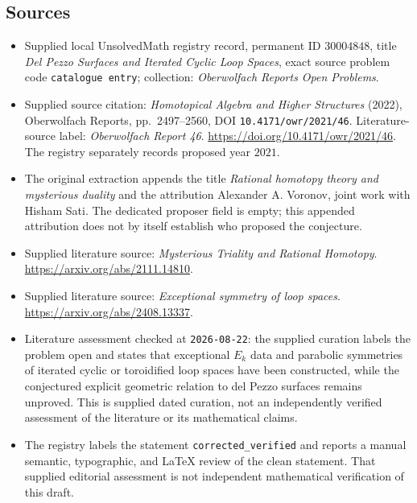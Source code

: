 \documentclass[11pt]{article}
\begin{document}
\subsection{Sources}
\begin{itemize}
\item Supplied local UnsolvedMath registry record, permanent ID \(30004848\), title \emph{Del Pezzo Surfaces and Iterated Cyclic Loop Spaces}, exact source problem code \texttt{catalogue entry}; collection: \emph{Oberwolfach Reports Open Problems}.
\item Supplied source citation: \emph{Homotopical Algebra and Higher Structures} (2022), Oberwolfach Reports, pp.~2497--2560, DOI \texttt{10.4171/owr/2021/46}. Literature-source label: \emph{Oberwolfach Report 46}. \url{https://doi.org/10.4171/owr/2021/46}. The registry separately records proposed year \(2021\).
\item The original extraction appends the title \emph{Rational homotopy theory and mysterious duality} and the attribution Alexander A. Voronov, joint work with Hisham Sati. The dedicated proposer field is empty; this appended attribution does not by itself establish who proposed the conjecture.
\item Supplied literature source: \emph{Mysterious Triality and Rational Homotopy}. \url{https://arxiv.org/abs/2111.14810}.
\item Supplied literature source: \emph{Exceptional symmetry of loop spaces}. \url{https://arxiv.org/abs/2408.13337}.
\item Literature assessment checked at \texttt{2026-08-22}: the supplied curation labels the problem open and states that exceptional \(E_k\) data and parabolic symmetries of iterated cyclic or toroidified loop spaces have been constructed, while the conjectured explicit geometric relation to del Pezzo surfaces remains unproved. This is supplied dated curation, not an independently verified assessment of the literature or its mathematical claims.
\item The registry labels the statement \texttt{corrected\_verified} and reports a manual semantic, typographic, and LaTeX review of the clean statement. That supplied editorial assessment is not independent mathematical verification of this draft.
\end{itemize}
\end{document}
